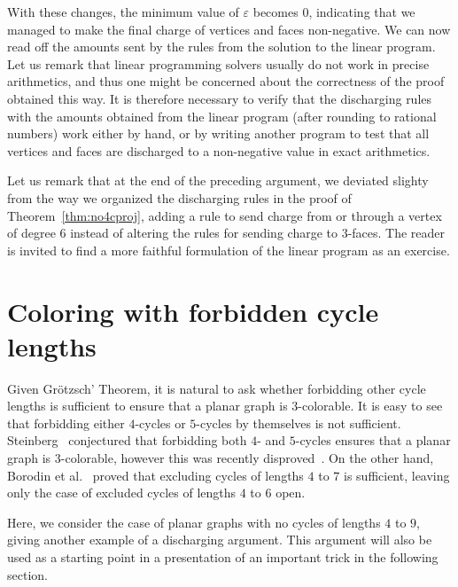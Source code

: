 \documentclass[12pt,twoside,openright,a4paper]{book}
\begin{document}
With these changes, the minimum value of $\varepsilon$ becomes $0$, indicating that we managed to make the final charge
of vertices and faces non-negative.  We can now read off the amounts sent by the rules from the solution to the linear program.
Let us remark that linear programming solvers usually do not work in precise arithmetics, and thus one might be concerned
about the correctness of the proof obtained this way.  It is therefore necessary to verify that the discharging rules with
the amounts obtained from the linear program (after rounding to rational numbers) work either by hand, or by writing another program
to test that all vertices and faces are discharged to a non-negative value in exact arithmetics.

Let us remark that at the end of the preceding argument, we deviated slighty from the way we organized the discharging rules
in the proof of Theorem~\ref{thm:no4cproj}, adding a rule to send charge from or through a vertex of degree 6 instead of altering
the rules for sending charge to $3$-faces.  The reader is invited to find a more faithful formulation of the linear program
as an exercise.

\section{Coloring with forbidden cycle lengths}

Given Gr\"otzsch' Theorem, it is natural to ask whether forbidding other cycle lengths is sufficient to
ensure that a planar graph is $3$-colorable.  It is easy to see that forbidding either $4$-cycles or $5$-cycles
by themselves is not sufficient.  Steinberg~\cite{conj-stein} conjectured that forbidding both $4$- and $5$-cycles
ensures that a planar graph is $3$-colorable, however this was recently disproved~\cite{steinfalse}.
On the other hand, Borodin et al.~\cite{bor47} proved that excluding cycles of lengths $4$ to $7$ is sufficient,
leaving only the case of excluded cycles of lengths $4$ to $6$ open.

Here, we consider the case of planar graphs with no cycles of lengths $4$ to $9$,
giving another example of a discharging argument.
This argument will also be used as a starting point in a presentation of an important trick in the following section.
\end{document}
